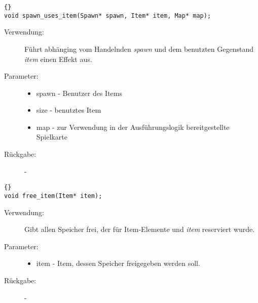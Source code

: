 \documentclass[11pt,a4paper,notitlepage]{report}
\begin{document}
		\begin{lstlisting}[caption=spawn\_uses\_item]{}
void spawn_uses_item(Spawn* spawn, Item* item, Map* map);
		\end{lstlisting}
		
	\begin{description}
		\item[Verwendung:] Führt abhänging vom Handelnden \textit{spawn} und dem benutzten Gegenstand \textit{item} einen Effekt aus.
		\item[Parameter:] \hfill
		\begin{itemize}
			\item spawn - Benutzer des Items
			\item size - benutztes Item
			\item map - zur Verwendung in der Ausführungslogik bereitgestellte Spielkarte
		\end{itemize}
		\item[Rückgabe:] -
	\end{description}
	
		\begin{lstlisting}[caption=free\_spawn]{}
void free_item(Item* item);
		\end{lstlisting}
		
	\begin{description}
		\item[Verwendung:] Gibt allen Speicher frei, der für Item-Elemente und \textit{item} reserviert wurde.
		\item[Parameter:] \hfill
		\begin{itemize}
			\item item - Item, dessen Speicher freigegeben werden soll.
		\end{itemize}
		\item[Rückgabe:] -
	\end{description}
	
	\newpage
\end{document}

